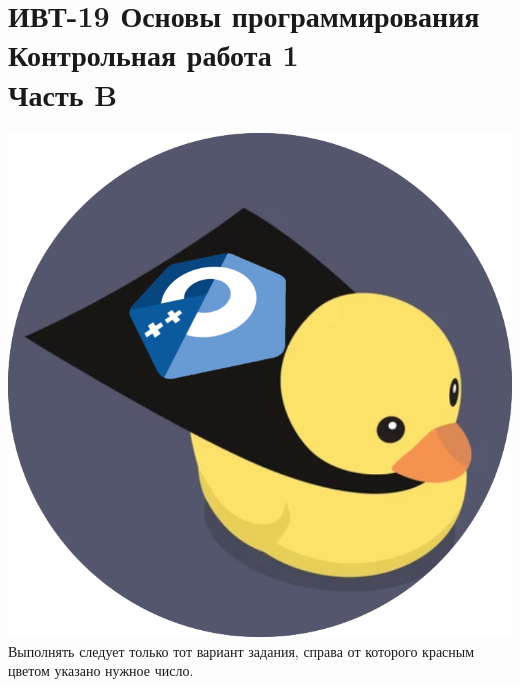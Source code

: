 \documentclass{article}
\begin{document}
\section*{{\normalsize ИВТ-19 Основы программирования}\\Контрольная работа 1\\{\normalsize Часть B}}

\vskip-2cm\strut\hfill\includegraphics[scale=.1]{logo-cpp.png}
\\[1cm]
Выполнять следует только тот вариант задания, справа от которого красным цветом указано нужное число.  
\end{document}
